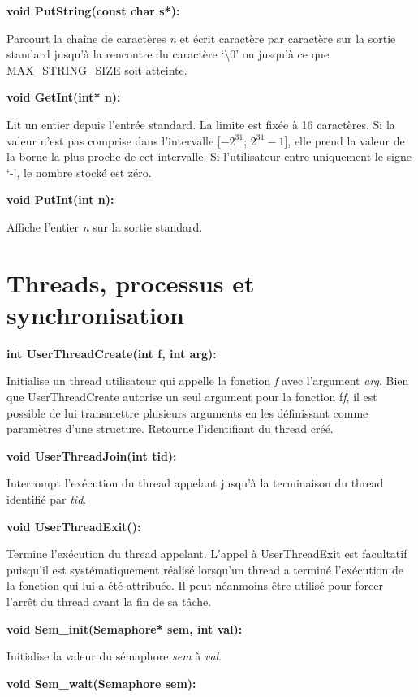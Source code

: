 \documentclass[12pt]{report}
\begin{document}
\bigskip
\textbf{void PutString(const char s*):}

Parcourt la chaîne de caractères \textit{n} et écrit caractère par caractère sur la
sortie standard jusqu'à la rencontre du caractère `\textbackslash 0' ou jusqu'à
ce que MAX\_STRING\_SIZE soit atteinte.


\bigskip
\textbf{void GetInt(int* n):}

Lit un entier depuis l'entrée standard. La limite est fixée à 16 caractères. Si la valeur n'est pas comprise dans l'intervalle [$-2^{31}$;
$2^{31}-1$],  elle prend la valeur de la borne la plus proche de cet intervalle. Si l'utilisateur entre uniquement le signe `-', le nombre stocké est zéro.
\bigskip

\textbf{void PutInt(int n):}

Affiche l'entier \textit{n} sur la sortie standard.\\


\section{Threads, processus et synchronisation}
\bigskip

\textbf{int UserThreadCreate(int f, int arg):}

Initialise un thread utilisateur qui appelle la fonction \textit{f} avec l'argument \textit{arg}. Bien que UserThreadCreate autorise un seul argument pour la fonction f\textit{f}, il est possible de lui transmettre plusieurs arguments en les définissant comme paramètres d'une structure.
Retourne l’identifiant du thread créé.
\bigskip

\textbf{void UserThreadJoin(int tid):}

Interrompt l'exécution du thread appelant jusqu'à la terminaison du thread identifié par \textit{tid}.
\bigskip


\textbf{void UserThreadExit():}

Termine l'exécution du thread appelant. L'appel à UserThreadExit est facultatif puisqu'il est systématiquement réalisé lorsqu'un thread a terminé l'exécution de la fonction qui lui a été attribuée. Il peut néanmoins être utilisé pour forcer l'arrêt du thread avant la fin de sa tâche.
\bigskip


\textbf{void Sem\_init(Semaphore* sem, int val):}

Initialise la valeur du sémaphore \textit{sem} à \textit{val}.
\bigskip	


\textbf{void Sem\_wait(Semaphore sem):}
\end{document}
